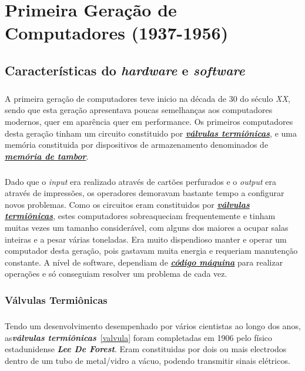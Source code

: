 \documentclass{report}
\begin{document}

\chapter{Primeira Geração de Computadores (1937-1956)}
\label{chap.PG}
\section{Características do \textit{hardware} e \textit{software}}
\paragraph{}
A primeira geração de computadores teve inicio na década de 30 do século \textit{XX}, sendo que esta geração apresentava poucas semelhanças aos computadores modernos, quer em aparência quer em performance.
Os primeiros computadores desta geração tinham um circuito constituido por  \hyperref[sec:valvulas]{\textbf{\textit{válvulas termiônicas}}}, e uma memória constituida por dispositivos de armazenamento denominados de \hyperref[sec:memoria]{\textbf{\textit{memória de tambor}}}.
\paragraph{}
Dado que o \textit{input} era realizado através de cartões perfurados e o \textit{output} era através de impressões, os operadores demoravam bastante tempo a configurar novos problemas.
Como os circuitos eram constituidos por \hyperref[sec:valvulas]{\textbf{\textit{válvulas termiônicas}}}, estes computadores sobreaqueciam frequentemente e tinham muitas vezes um tamanho considerável, com alguns dos maiores a ocupar salas inteiras e a pesar várias toneladas. Era muito dispendioso manter e operar um computador desta geração, pois gastavam muita energia e requeriam manutenção constante. \newline
A nível de software, dependiam de \hyperref[sec:codigo]{\textbf{\textit{código máquina}}} para realizar operações e só conseguiam resolver um problema de cada vez.


\subsection{Válvulas Termiônicas} 
\label{sec:valvulas}
\paragraph{}
Tendo um desenvolvimento desempenhado por vários cientistas ao longo dos anos, as\textbf{\textit{válvulas termiônicas}}~\ref{valvula} \cite{Valvulas} foram completadas em 1906 pelo físico estadunidense \textbf{\textit{Lee De Forest}}. Eram constituidas por dois ou mais electrodos dentro de um tubo de metal/vidro a vácuo, podendo transmitir sinais elétricos.
\end{document}
